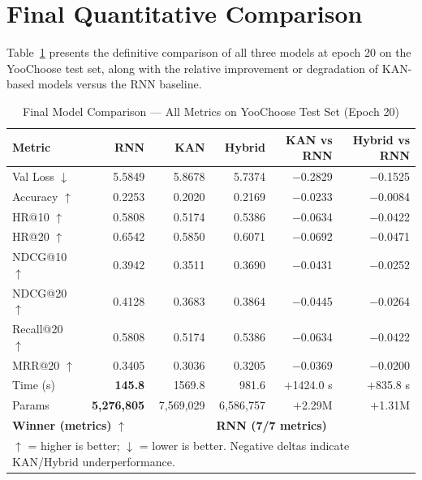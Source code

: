 \documentclass[12pt,a4paper]{report}
\begin{document}
\section{Final Quantitative Comparison}

Table~\ref{tab:results} presents the definitive comparison of all three models
at epoch 20 on the YooChoose test set, along with the relative improvement or
degradation of KAN-based models versus the RNN baseline.

\begin{table}[H]
\centering
\caption{Final Model Comparison --- All Metrics on YooChoose Test Set (Epoch 20)}
\begin{tabular}{l r r r r r}
\toprule
\textbf{Metric} & \textbf{RNN} & \textbf{KAN} & \textbf{Hybrid}
                & \textbf{KAN vs RNN} & \textbf{Hybrid vs RNN} \\
\midrule
Val Loss $\downarrow$  & 5.5849 & 5.8678 & 5.7374 & $-$0.2829 & $-$0.1525 \\
Accuracy $\uparrow$    & 0.2253 & 0.2020 & 0.2169 & $-$0.0233 & $-$0.0084 \\
HR@10 $\uparrow$       & 0.5808 & 0.5174 & 0.5386 & $-$0.0634 & $-$0.0422 \\
HR@20 $\uparrow$       & 0.6542 & 0.5850 & 0.6071 & $-$0.0692 & $-$0.0471 \\
NDCG@10 $\uparrow$     & 0.3942 & 0.3511 & 0.3690 & $-$0.0431 & $-$0.0252 \\
NDCG@20 $\uparrow$     & 0.4128 & 0.3683 & 0.3864 & $-$0.0445 & $-$0.0264 \\
Recall@20 $\uparrow$   & 0.5808 & 0.5174 & 0.5386 & $-$0.0634 & $-$0.0422 \\
MRR@20 $\uparrow$      & 0.3405 & 0.3036 & 0.3205 & $-$0.0369 & $-$0.0200 \\
\midrule
Time (s)               & \textbf{145.8}   & 1569.8   & 981.6    & $+$1424.0 s & $+$835.8 s \\
Params                 & \textbf{5,276,805} & 7,569,029 & 6,586,757 & $+$2.29M & $+$1.31M \\
\midrule
\multicolumn{3}{l}{\textbf{Winner (metrics)} $\uparrow$} & \multicolumn{3}{l}{\textbf{RNN (7/7 metrics)}} \\
\bottomrule
\multicolumn{6}{l}{\small $\uparrow$ = higher is better; $\downarrow$ = lower is better. Negative deltas indicate KAN/Hybrid underperformance.} \\
\end{tabular}
\label{tab:results}
\end{table}
\end{document}
